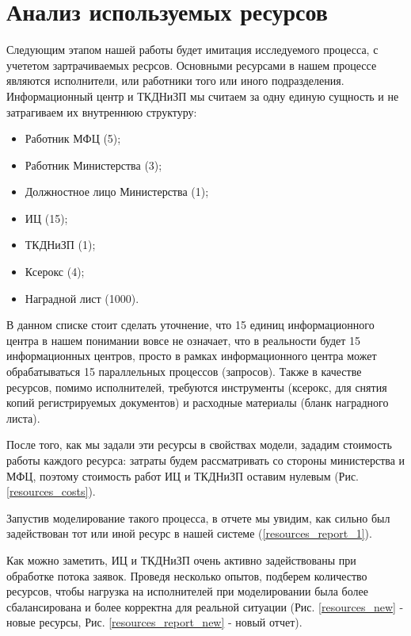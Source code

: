 \chapter{Анализ используемых ресурсов}

Следующим этапом нашей работы будет имитация исследуемого
процесса, с учететом зартрачиваемых ресрсов. Основными
ресурсами в нашем процессе являются исполнители, или
работники того или иного подразделения. Информационный
центр и ТКДНиЗП мы считаем за одну единую сущность и не
затрагиваем их внутреннюю структуру:

\begin{itemize}
    \item Работник МФЦ (5);
    \item Работник Министерства (3);
    \item Должностное лицо Министерства (1);
    \item ИЦ (15);
    \item ТКДНиЗП (1);
    \item Ксерокс (4);
    \item Наградной лист (1000).
\end{itemize}

В данном списке стоит сделать уточнение, что 15 единиц
информационного центра в нашем понимании вовсе не означает,
что в реальности будет 15 информационных центров, просто
в рамках информационного центра может обрабатываться 15
параллельных процессов (запросов). Также в качестве ресурсов,
помимо исполнителей, требуются инструменты (ксерокс, для
снятия копий регистрируемых документов) и расходные
материалы (бланк наградного листа).

После того, как мы задали эти ресурсы в свойствах модели,
зададим  стоимость работы каждого ресурса: затраты будем
рассматривать со стороны министерства и МФЦ, поэтому
стоимость работ ИЦ и ТКДНиЗП оставим нулевым
(Рис. \ref{resources_costs}).

Запустив моделирование такого процесса, в отчете мы увидим,
как сильно был задействован тот или иной ресурс в нашей
системе (\ref{resources_report_1}).

\clearpage

Как можно заметить, ИЦ и ТКДНиЗП очень активно задействованы
при обработке потока заявок. Проведя несколько опытов,
подберем количество ресурсов, чтобы нагрузка на исполнителей
при моделировании была более сбалансирована и более корректна
для реальной ситуации (Рис. \ref{resources_new} - новые ресурсы,
Рис. \ref{resources_report_new} - новый отчет).

